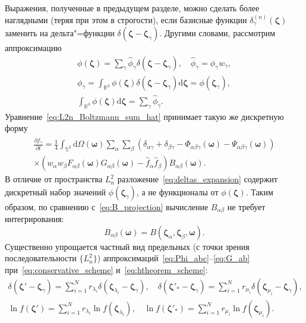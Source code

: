 \documentclass{article}
\newcommand{\dd}{\mathrm{d}}
\newcommand{\pder}[2][]{\frac{\partial#1}{\partial#2}}
\newcommand{\dzeta}{\boldsymbol{\dd\zeta}}
\newcommand{\bzeta}{\boldsymbol{\zeta}}
\newcommand{\bomega}{\boldsymbol{\omega}}
\begin{document}
Выражения, полученные в предыдущем разделе, можно сделать более наглядными (теряя при этом в строгости),
если базисные функции \(\delta^{(n)}_\gamma(\bzeta)\) заменить на дельта"=функции \(\delta(\bzeta-\bzeta_\gamma)\).
Другими словами, рассмотрим аппроксимацию
\begin{gather}
    \phi(\bzeta) = \sum_\gamma \hat{\phi}_\gamma \delta(\bzeta-\bzeta_\gamma),
    \quad \hat{\phi}_\gamma = \phi_\gamma w_\gamma, \label{eq:deltas_expansion} \\
    \phi_\gamma = \int_{\mathbb{R}^3} \phi(\bzeta) \delta(\bzeta-\bzeta_\gamma) \dzeta = \phi(\bzeta_\gamma), \label{eq:deltas_coords} \\
    \int_{\mathbb{R}^3} \phi(\bzeta)\dzeta = \sum_\gamma \hat{\phi}_\gamma. \label{eq:deltas_integral}
\end{gather}
Уравнение~\eqref{eq:L2n_Boltzmann_sum_hat} принимает такую же дискретную форму
\begin{multline}\label{eq:deltas_Boltzmann_sum_hat}
    \pder[\hat{f}_\gamma]{t} =
        \frac14\int_{\mathbb{S}^2}\dd\Omega(\bomega) \sum_\alpha \sum_\beta
        \left(\delta_{\alpha\gamma} + \delta_{\beta\gamma}
            - \Phi_{\alpha\beta\gamma}(\bomega) - \Psi_{\alpha\beta\gamma}(\bomega)\right) \\
        \times\left(w_\alpha w_\beta F_{\alpha\beta}(\bomega)G_{\alpha\beta}(\bomega)
            - \hat{f}_\alpha \hat{f}_\beta\right)
        B_{\alpha\beta}(\bomega).
\end{multline}
В отличие от пространства \(L^2_n\) разложение~\eqref{eq:deltas_expansion} содержит дискретный набор значений \(\phi(\bzeta_\gamma)\),
а не функционалы от \(\phi(\bzeta)\). Таким образом, по сравнению с~\eqref{eq:B_projection} вычисление \(B_{\alpha\beta}\)
не требует интегрирования:
\begin{equation}\label{B_exact}
    B_{\alpha\beta}(\bomega) = B(\bzeta_\alpha,\bzeta_\beta,\bomega).
\end{equation}
Существенно упрощается частный вид предельных (с точки зрения последовательности \(\{L^2_n\}\))
аппроксимаций~\eqref{eq:Phi_abc}--\eqref{eq:G_ab} при~\eqref{eq:conservative_scheme} и~\eqref{eq:htheorem_scheme}:
\begin{gather}
    \delta(\bzeta'-\bzeta_\gamma) = \sum_{i=1}^N r_{\lambda_i} \delta(\bzeta_{\lambda_i}-\bzeta_\gamma), \quad
    \delta(\bzeta'_*-\bzeta_\gamma) = \sum_{i=1}^N r_{\mu_i}\delta(\bzeta_{\mu_i}-\bzeta_\gamma), \label{eq:deltas_conservative}\\
    \ln f(\bzeta') = \sum_{i=1}^N r_{\lambda_i} \ln f(\bzeta_{\lambda_i}), \quad
    \ln f(\bzeta'_*) = \sum_{i=1}^N r_{\mu_i} \ln f(\bzeta_{\mu_i}). \label{eq:deltas_htheorem}
\end{gather}
\end{document}
